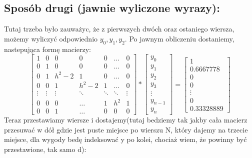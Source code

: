 \documentclass[12pt]{article}
\begin{document}
\subsection{Sposób drugi (jawnie wyliczone wyrazy):}
Tutaj trzeba było zauważyc, że z pierwszych dwóch oraz ostaniego wiersza, możemy wyliczyć odpowiednio $y_{0}, y_{1}, y_{2}$. Po jawnym obliczeniu dostaniemy, nastepująca formę macierzy:
\[
\begin{bmatrix}
    1 & 0 & 0 & 0 & 0 & \dots & 0\\
    0 & 1 & 0 & 0 & 0 & \dots & 0\\ 
    0 & 1 & h^{2}-2 & 1 & 0 & \dots & 0\\
    0 & 0 & 1 & h^{2}-2 & 1 &\dots & 0\\
    \vdots & \vdots & \vdots & \ddots & \ddots & \ddots & \vdots\\
    0 & 0 & 0 & \hdots & 1 & h^{2} & 1\\
    0 & 0 & 1 & \hdots & 0 & 0 & 0
\end{bmatrix}
*
\begin{bmatrix}
    y_{0}\\
    y_{1}\\
    y_{2}\\
    y_{3}\\
    \vdots\\
    y_{n-1}\\
    y_{n}
\end{bmatrix}
=
\begin{bmatrix}
    1\\
    0.6667778\\
    0\\
    0\\
    \vdots\\
    0\\
    0.33328889
\end{bmatrix}
\]
Teraz przestawiamy wiersze i dostajemy(tutaj bedziemy tak jakby cała macierz przesuwać w dół gdzie jest puste miejsce po wierszu N, który dajemy na trzecie miejsce, dla wygody bedę indeksować y po kolei, chociaż wiem, że powinny być przestawione, tak samo d):
\end{document}
